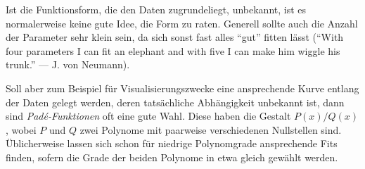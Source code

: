 Ist die Funktionsform, die den Daten zugrundeliegt, unbekannt, ist es
normalerweise keine gute Idee, die Form zu raten. Generell sollte auch
die Anzahl der Parameter sehr klein sein, da sich sonst fast alles
"`gut"' fitten lässt ("`With four parameters I can fit an elephant and
with five I can make him wiggle his trunk."' --- J. von Neumann).

Soll aber zum Beispiel für Visualisierungszwecke eine ansprechende
Kurve entlang der Daten gelegt werden, deren tatsächliche Abhängigkeit
unbekannt ist, dann sind \emph{Pad\'e-Funktionen} oft eine gute
Wahl. Diese haben die Gestalt $P(x)/Q(x)$, wobei $P$ und $Q$ zwei
Polynome mit paarweise verschiedenen Nullstellen sind. Üblicherweise
lassen sich schon für niedrige Polynomgrade ansprechende Fits finden,
sofern die Grade der beiden Polynome in etwa gleich gewählt werden.

